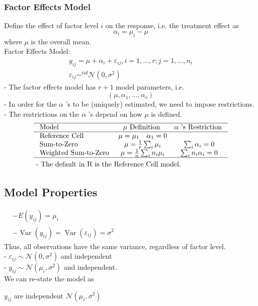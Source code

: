 \documentclass[11pt,a4paper]{article}
\begin{document}
\subsubsection{Factor Effects Model}
Define the effect of factor level $i$ on the response, i.e. the treatment effect as
$$
\alpha_{i}=\mu_{i}-\mu
$$
where $\mu$ is the overall mean.\\
Factor Effects Model:
$$
\begin{gathered}
y_{i j}=\mu+\alpha_{i}+\varepsilon_{i j}, i=1, \ldots, r ; j=1, \ldots, n_{i} \\
\varepsilon_{i j} \sim^{i i d} \mathcal{N}\left(0, \sigma^{2}\right)
\end{gathered}
$$
- The factor effects model has $r+1$ model parameters, i.e.
$$
\left(\mu, \alpha_{1}, \ldots, \alpha_{r}\right)
$$
- In order for the $\alpha$ 's to be (uniquely) estimated, we need to impose restrictions.\\
- The restrictions on the $\alpha$ 's depend on how $\mu$ is defined.
$$\begin{aligned}
    &\begin{array}{lcc}
    \hline \text { Model } & \mu \text { Definition } & \alpha \text { 's Restriction } \\
    \hline
    \text { Reference Cell } & \mu=\mu_{1} \quad \alpha_{1}=0 \\
    \text { Sum-to-Zero } & \mu=\frac{1}{r} \sum_{i} \mu_{i} & \sum_{i} \alpha_{i}=0 \\
    \text { Weighted Sum-to-Zero } & \mu=\frac{1}{n} \sum_{i} n_{i} \mu_{i} & \sum_{i} n_{i} \alpha_{i}=0 \\
    \hline
    \end{array}\\
    &\text { - The default in } \mathrm{R} \text { is the Reference Cell model. }
\end{aligned}
$$

\subsection{Model Properties}
$\begin{aligned}
&-E\left(y_{i j}\right)=\mu_{i} \\
&-\operatorname{Var}\left(y_{i j}\right)=\operatorname{Var}\left(\varepsilon_{i j}\right)=\sigma^{2}
\end{aligned}$\\
Thus, all observations have the same variance, regardless of factor level.\\
- $\varepsilon_{i j} \sim \mathcal{N}\left(0, \sigma^{2}\right)$ and independent\\
- $y_{i j} \sim \mathcal{N}\left(\mu_{i}, \sigma^{2}\right)$ and independent.\\
We can re-state the model as
\begin{center}
    $y_{i j}$ are independent $\mathcal{N}\left(\mu_{i}, \sigma^{2}\right)$
\end{center}
\end{document}

